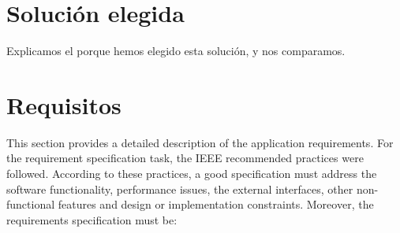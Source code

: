 \section{Solución elegida}
\label{sec:solution_selection}

Explicamos el porque hemos elegido esta solución, y nos comparamos.

\begin{table}[htbp]
\centering
\caption{Comparison of simulation \gls{framework}s for distributed computing systems.}
\label{tab:comparison_frameworks}
\end{table}


\section{Requisitos}
\label{sec:requirements}

This section provides a detailed description of the application requirements. For the requirement specification task, the IEEE recommended practices \cite{ieee1998} were followed. According to these practices, a good specification must address the software functionality, performance issues, the external interfaces, other non-functional features and design or implementation constraints. Moreover, the requirements specification must be:

